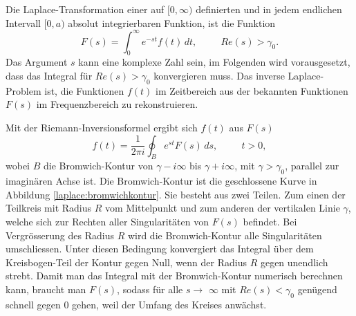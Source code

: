 %
%
%
Die Laplace-Transformation einer auf $[0, \infty)$ definierten und in jedem endlichen Intervall $[0, a)$ absolut integrierbaren Funktion, ist die Funktion
\begin{equation}
F(s) = \int_0^\infty e^{-st}f(t)\,dt,~~ \qquad Re(s)>\gamma_{0}.
\label{laplace:definition}
\end{equation}
Das Argument $s$ kann eine komplexe Zahl sein, im Folgenden wird vorausgesetzt, dass das Integral für $Re(s)>\gamma_{0}$ konvergieren muss.
Das inverse Laplace-Problem ist, die Funktionen $f(t)$ im Zeitbereich aus der bekannten Funktionen $F(s)$ im Frequenzbereich zu rekonstruieren.

Mit der Riemann-Inversionsformel ergibt sich $f(t)$ aus $F(s)$
\begin{equation}
f(t) = \frac{1}{2\pi i} \oint_{B} e^{st}F(s)\,ds,~~\qquad t>0,
\label{laplace:riemanninversionsformel}
\end{equation}
wobei $B$ die Bromwich-Kontur von $\gamma-i\infty$ bis $\gamma+i\infty$, mit $\gamma>\gamma_{0}$, parallel zur imaginären Achse ist. Die Bromwich-Kontur ist die geschlossene Kurve in Abbildung \ref{laplace:bromwichkontur}. Sie besteht aus zwei Teilen. Zum einen der Teilkreis mit Radius $R$ vom Mittelpunkt und zum anderen der vertikalen Linie $\gamma$, welche sich zur Rechten aller Singularitäten von $F(s)$ befindet.  Bei Vergrösserung des Radius $R$ wird die Bromwich-Kontur alle Singularitäten umschliessen. Unter diesen Bedingung konvergiert das Integral über dem Kreisbogen-Teil der Kontur gegen Null, wenn der Radius $R$ gegen unendlich strebt.
Damit man das Integral mit der Bromwich-Kontur numerisch berechnen kann, braucht man $F(s)$, sodass für alle $s\rightarrow$ $\infty$ mit $Re(s)< \gamma_{0}$ genügend schnell gegen 0 gehen, weil der Umfang des Kreises anwächst.


